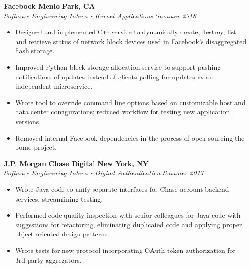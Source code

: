 \documentclass[margin,line]{resume}
\begin{document}
\begin{resume}
	\textbf{Facebook \hfill Menlo Park, CA} \\\vspace{1mm}%
	\textsl{Software Engineering Intern - Kernel Applications} \hfill \textsl{Summer 2018}
	\begin{itemize}[leftmargin=4mm]
		\item Designed and implemented C\texttt{++} service to dynamically create, destroy, list and retrieve status of network block devices used in Facebook's disaggregated flash storage.
		\item Improved Python block storage allocation service to support pushing notifications of updates  instead of clients polling for updates as an independent microservice.
		\item Wrote tool to override command line options based on customizable host and data center configurations; reduced workflow for testing new application versions.
		\item Removed internal Facebook dependencies in the process of open sourcing the oomd \href{https://github.com/facebookincubator/oomd}{\faGithub} project. 
	\end{itemize}
	\vspace{-1.5mm}
	
	\textbf{J.P. Morgan Chase Digital \hfill New York, NY} \\\vspace{1mm}%
	\textsl{Software Engineering Intern - Digital Authentication} \hfill \textsl{Summer 2017}
	\begin{itemize}[leftmargin=4mm]
		\item Wrote Java code to unify separate interfaces for Chase account backend services, streamlining testing.
		\item Performed code quality inspection with senior colleagues for Java code with suggestions for refactoring, eliminating duplicated code and applying proper object-oriented design patterns.
		\item Wrote tests for new protocol incorporating OAuth token authorization for 3rd-party aggregators.
	\end{itemize}
	
	\vspace{1.5mm}
	

\end{resume}
\end{document}
